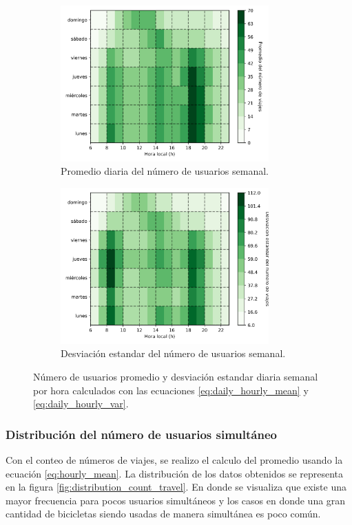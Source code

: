 \begin{figure}[H]
    \centering
    \begin{subfigure}[b]{8cm}
        \includegraphics[width=8cm]{Graphics/daily_hourly_mean_count_travel.png}
        \caption{Promedio diaria del número de usuarios semanal.}
        \label{fig:daily_hourly_mean_count_travel}
    \end{subfigure}
    \begin{subfigure}[b]{8cm}
        \includegraphics[width=8cm]{Graphics/daily_hourly_var_count_travel.png}
        \caption{Desviación estandar del número de usuarios semanal.}
        \label{fig:daily_hourly_var_count_travel}
    \end{subfigure}
    \caption{Número de usuarios promedio y desviación estandar diaria semanal por hora calculados con las ecuaciones \ref{eq:daily_hourly_mean} y \ref{eq:daily_hourly_var}.}
    \label{fig:daily_hourly_count_travel}
\end{figure}

\subsubsection{Distribución del número de usuarios simultáneo}

Con el conteo de números de viajes, se realizo el calculo del promedio usando la ecuación \ref{eq:hourly_mean}. La distribución de los datos obtenidos se representa en la figura \ref{fig:distribution_count_travel}. En donde se visualiza que existe una mayor frecuencia para pocos usuarios simultáneos y los casos en donde una gran cantidad de bicicletas siendo usadas de manera simultánea es poco común.

